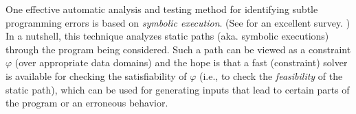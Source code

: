 One effective automatic analysis and testing method for identifying subtle programming errors is based on \emph{symbolic execution}.
(See \cite{symbex-survey} for an excellent survey. )
In a nutshell, this technique analyzes static paths
(aka. symbolic executions) through the program being considered. %
Such a path can be viewed as a constraint $\varphi$ (over
appropriate data domains) and the hope is that a fast (constraint)
solver is available for checking the satisfiability of $\varphi$ (i.e., to check
the \emph{feasibility} of the static path), which can be used for generating
inputs that lead to certain parts of the program or an erroneous behavior.







